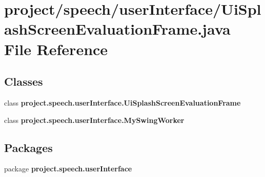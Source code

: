 \section{project/speech/user\+Interface/\+Ui\+Splash\+Screen\+Evaluation\+Frame.java File Reference}
\label{_ui_splash_screen_evaluation_frame_8java}
\subsection*{Classes}
\begin{DoxyCompactItemize}
\item 
class {\bf project.\+speech.\+user\+Interface.\+Ui\+Splash\+Screen\+Evaluation\+Frame}
\item 
class {\bfseries project.\+speech.\+user\+Interface.\+My\+Swing\+Worker}
\end{DoxyCompactItemize}
\subsection*{Packages}
\begin{DoxyCompactItemize}
\item 
package {\bf project.\+speech.\+user\+Interface}
\end{DoxyCompactItemize}
